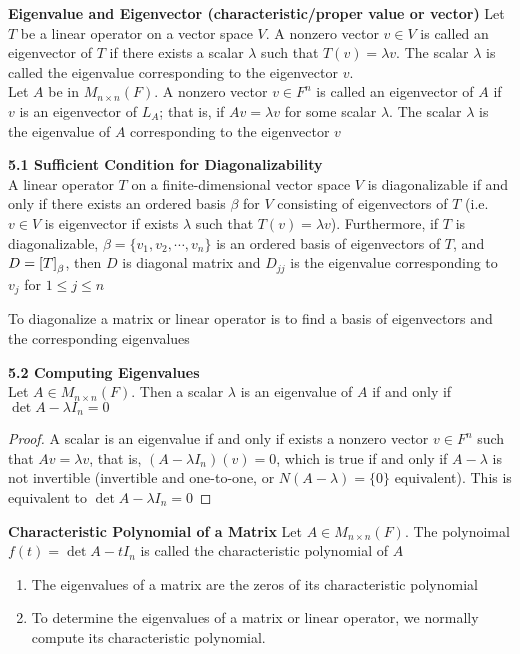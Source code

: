 \documentclass[11pt]{article}
\begin{document}
\begin{defn*}
    \textbf{Eigenvalue and Eigenvector (characteristic/proper value or vector)} Let $T$ be a linear operator on a vector space $V$. A nonzero vector $v\in V$ is called an eigenvector of $T$ if there exists a scalar $\lambda$ such that $T(v) = \lambda v$. The scalar $\lambda$ is called the eigenvalue corresponding to the eigenvector $v$. \\
    Let $A$ be in $M_{n\times n}(F)$. A nonzero vector $v\in F^n$ is called an eigenvector of $A$ if $v$ is an eigenvector of $L_A$; that is, if $Av = \lambda v$ for some scalar $\lambda$. The scalar $\lambda$ is the eigenvalue of $A$ corresponding to the eigenvector $v$
\end{defn*}

\begin{theorem*}
    \textbf{5.1 Sufficient Condition for Diagonalizability}\\
     A linear operator $T$ on a finite-dimensional vector space $V$ is diagonalizable if and only if there exists an ordered basis $\beta$ for $V$ consisting of eigenvectors of $T$ (i.e. $v\in V$ is eigenvector if exists $\lambda$ such that $T(v) = \lambda v$). Furthermore, if $T$ is diagonalizable, $\beta = \{v_1,v_2,\cdots, v_n\}$ is an ordered basis of eigenvectors of $T$, and $D = \left[ T \right]_{\beta}$, then $D$ is diagonal matrix and $D_{jj}$ is the eigenvalue corresponding to $v_j$ for $1\leq j \leq n$
     \begin{rem}
         To diagonalize a matrix or linear operator is to find a basis of eigenvectors and the corresponding eigenvalues
     \end{rem}
\end{theorem*}


\begin{theorem*}
    \textbf{5.2 Computing Eigenvalues} \\ 
    Let $A\in M_{n\times n}(F)$. Then a scalar $\lambda$ is an eigenvalue of $A$ if and only if $\det{A-\lambda I_n} =0$
    \begin{proof}
        A scalar is an eigenvalue if and only if exists a nonzero vector $v\in F^n$ such that $Av = \lambda v$, that is, $(A - \lambda I_n)(v) = 0$, which is true if and only if $A-\lambda$ is not invertible (invertible and one-to-one, or $N(A-\lambda)=\{0\}$ equivalent). This is equivalent to $\det{A - \lambda I_n} = 0$
    \end{proof}
\end{theorem*}


\begin{defn*}
    \textbf{Characteristic Polynomial of a Matrix} Let $A\in M_{n\times n}(F)$. The polynoimal $f(t) = \det{A - tI_n}$ is called the characteristic polynomial of $A$
    \begin{enumerate}
        \item The eigenvalues of a matrix are the zeros of its characteristic polynomial 
        \item To determine the eigenvalues of a matrix or linear operator, we normally compute its characteristic polynomial.
    \end{enumerate}
\end{defn*}
\end{document}
